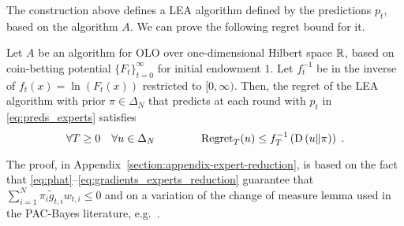 The construction above defines a \ac{LEA} algorithm defined by the predictions
$p_t$, based on the algorithm $A$.  We can prove the following regret bound for
it.
%
\begin{theorem}
\label{theorem:regret-bound-experts}
Let $A$ be an algorithm for \ac{OLO} over
one-dimensional Hilbert space $\mathbb{R}$, based on coin-betting potential
$\{F_t\}_{t=0}^\infty$ for initial
endowment $1$. Let $f_t^{-1}$ be in the inverse of $f_t(x) = \ln(F_t(x))$
restricted to $[0,\infty)$.  Then, the regret of the \ac{LEA}
algorithm with prior $\pi \in \Delta_N$ that predicts at each round with $p_t$ in \eqref{eq:preds_experts} satisfies
\[
\forall T \ge 0 \quad \forall u \in \Delta_N \qquad \qquad
\operatorname{Regret}_T(u) \le f_T^{-1}\left( \operatorname{D}\left({u}\middle\|{\pi}\right) \right) \; .
\]
\end{theorem}
The proof, in Appendix~\ref{section:appendix-expert-reduction}, is based on the
fact that \eqref{eq:phat}--\eqref{eq:gradients_experts_reduction} guarantee
that $\sum_{i=1}^N \pi_i \widetilde g_{t,i} w_{t,i} \le 0$ and on a variation
of the change of measure lemma used in the PAC-Bayes literature,
e.g.~\cite{McAllester-2013}.

